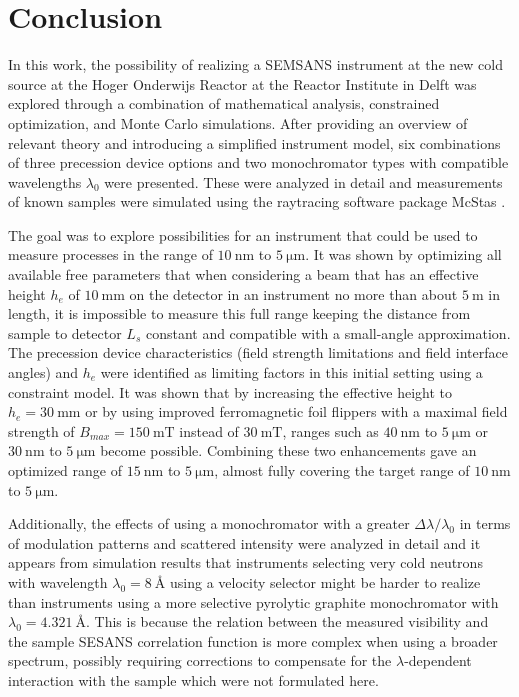 \chapter{Conclusion}
\label{chapter:conclusion}
\label{c7:conclusion}
In this work, the possibility of realizing a SEMSANS instrument at the new cold source at the Hoger Onderwijs Reactor at the Reactor Institute in Delft was explored through a combination of mathematical analysis, constrained optimization, and Monte Carlo simulations. After providing an overview of relevant theory and introducing a simplified instrument model, six combinations of three precession device options and two monochromator types with compatible wavelengths $\lambda_0$ were presented. These were analyzed in detail and measurements of known samples were simulated using the raytracing software package McStas \cite{willendrup2020}. 

The goal was to explore possibilities for an instrument that could be used to measure processes in the range of $\SI{10}{\nano\meter}$ to $\SI{5}{\micro\meter}$. It was shown by optimizing all available free parameters that when considering a beam that has an effective height $h_e$ of $\SI{10}{\milli\meter}$ on the detector in an instrument no more than about $\SI{5}{\meter}$ in length, it is impossible to measure this full range keeping the distance from sample to detector $L_s$ constant and compatible with a small-angle approximation. The precession device characteristics (field strength limitations and field interface angles) and  $h_e$ were identified as limiting factors in this initial setting using a constraint model. It was shown that by increasing the effective height to $h_e = \SI{30}{\milli\meter}$ or by using improved ferromagnetic foil flippers with a maximal field strength of $B_{max} = \SI{150}{\milli\tesla}$ instead of $\SI{30}{\milli\tesla}$, ranges such as $\SI{40}{\nano\meter}$ to $\SI{5}{\micro\meter}$ or $\SI{30}{\nano\meter}$ to $\SI{5}{\micro\meter}$ become possible. Combining these two enhancements gave an optimized range of $\SI{15}{\nano\meter}$ to $\SI{5}{\micro\meter}$, almost fully covering the target range of $\SI{10}{\nano\meter}$ to $\SI{5}{\micro\meter}$.

Additionally, the effects of using a monochromator with a greater $\Delta\lambda/\lambda_0$ in terms of modulation patterns and scattered intensity were analyzed in detail and it appears from simulation results that instruments selecting very cold neutrons with wavelength $\lambda_0 = \SI{8}{\angstrom}$ using a velocity selector might be harder to realize than instruments using a more selective pyrolytic graphite monochromator with $\lambda_0 = \SI{4.321}{\angstrom}$. This is because the relation between the measured visibility and the sample SESANS correlation function is more complex when using a broader spectrum, possibly requiring corrections to compensate for the $\lambda$-dependent interaction with the sample which were not formulated here.

